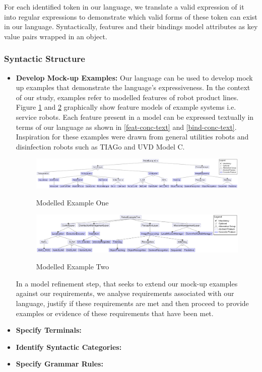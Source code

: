 For each identified token in our language, we translate a valid expression of it into regular expressions to demonstrate which valid forms of these token can exist in our language. Syntactically, features and their bindings model attributes as key value pairs wrapped in an object.

\subsubsection{Syntactic Structure}
\begin{itemize}
    \item[] \textbf{Develop Mock-up Examples: }Our language can be used to develop mock up examples that demonstrate the language's expressiveness. In the context of our study, examples refer to modelled features of robot product lines. Figure \ref{ex1} and \ref{ex2} graphically show feature models of example systems i.e. service robots. Each feature present in a model can be expressed textually in terms of our language as shown in \ref{feat-conc-text} and \ref{bind-conc-text}. Inspiration for these examples were drawn from general utilities robots and disinfection robots such as TIAGo and UVD Model C.
    
    \begin{figure}[H]
    \caption{Modelled Example One}
    \centering
    \includegraphics[width=\columnwidth]{diagrams/ex1.png}
    \label{ex1}
    \end{figure}
    
    \begin{figure}[H]
    \caption{Modelled Example Two}
    \centering
    \includegraphics[width=\columnwidth]{diagrams/ex2.png}
    \label{ex2}
    \end{figure}
    
    In a model refinement step, that seeks to extend our mock-up examples against our requirements, we analyse requirements associated with our language, justify if these requirements are met and then proceed to provide examples or evidence of these requirements that have been met.
    
    \item[] \textbf{Specify Terminals: }
    \item[] \textbf{Identify Syntactic Categories: }
    \item[] \textbf{Specify Grammar Rules: }
\end{itemize}
